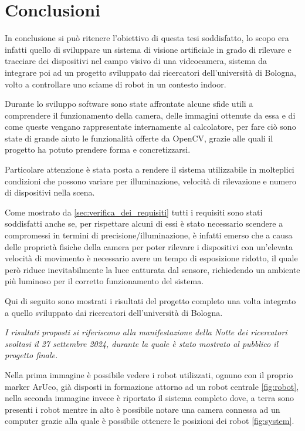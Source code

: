 \documentclass[12pt,a4paper,openright,twoside]{book}
\begin{document}
\chapter{Conclusioni}
In conclusione si può ritenere l'obiettivo di questa tesi soddisfatto, lo scopo era infatti quello di sviluppare un sistema di visione artificiale in grado di rilevare e tracciare dei dispositivi nel campo visivo di una videocamera, sistema da integrare poi ad un progetto sviluppato dai ricercatori dell'università di Bologna, volto a controllare uno sciame di robot in un contesto indoor.

Durante lo sviluppo software sono state affrontate alcune sfide utili a comprendere il funzionamento della camera, delle immagini ottenute da essa e di come queste vengano rappresentate internamente al calcolatore, per fare ciò sono state di grande aiuto le funzionalità offerte da OpenCV, grazie alle quali il progetto ha potuto prendere forma e concretizzarsi.

Particolare attenzione è stata posta a rendere il sistema utilizzabile in molteplici condizioni che possono variare per illuminazione, velocità di rilevazione e numero di dispositivi nella scena.

Come mostrato da \ref{sec:verifica_dei_requisiti} tutti i requisiti sono stati soddisfatti anche se, per rispettare alcuni di essi è stato necessario scendere a compromessi in termini di precisione/illuminazione, è infatti emerso che a causa delle proprietà fisiche della camera per poter rilevare i dispositivi con un'elevata velocità di movimento è necessario avere un tempo di esposizione ridotto, il quale però riduce inevitabilmente la luce catturata dal sensore, richiedendo un ambiente più luminoso per il corretto funzionamento del sistema.
\pagebreak

Qui di seguito sono mostrati i risultati del progetto completo una volta integrato a quello sviluppato dai ricercatori dell'università di Bologna.

\vspace{0.5cm}
\textit{I risultati proposti si riferiscono alla manifestazione della Notte dei ricercatori svoltasi il 27 settembre 2024, durante la quale è stato mostrato al pubblico il progetto finale.}
\vspace{0.5cm}

Nella prima immagine è possibile vedere i robot utilizzati, ognuno con il proprio marker ArUco, già disposti in formazione attorno ad un robot centrale \ref{fig:robot}, nella seconda immagine invece è riportato il sistema completo dove, a terra sono presenti i robot mentre in alto è possibile notare una camera connessa ad un computer grazie alla quale è possibile ottenere le posizioni dei robot \ref{fig:system}.
\end{document}
